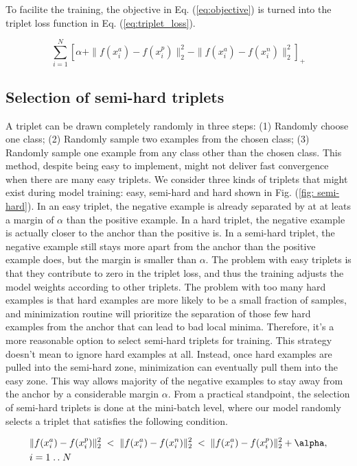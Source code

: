 To facilite the training, the objective in Eq. (\ref{eq:objective}) is turned into the
triplet loss function in Eq. (\ref{eq:triplet_loss}).

\begin{equation} \label{eq:triplet_loss}
    \sum_{i=1}^{N} \left[ \alpha + \|f(x_i^a) - f(x_i^p)\|_2^2 - \|f(x_i^a) -
    f(x_i^n)\|_2^2 \right]_+
\end{equation}


\subsection{Selection of semi-hard triplets}

A triplet can be drawn completely randomly in three steps: (1) Randomly choose
one class;  (2) Randomly sample two examples from the chosen class;  (3)
Randomly sample one example from any class other than the chosen class.  This
method, despite being easy to implement, might not deliver fast convergence when
there are many easy triplets.  We consider three kinds of triplets that might
exist during model training: easy, semi-hard and hard shown in Fig. (\ref{fig:
semi-hard}).  In an easy triplet, the negative example is already separated by
at at leats a margin of $\alpha$ than the positive example.  In a hard triplet,
the negative example is actually closer to the anchor than the positive is.  In
a semi-hard triplet, the negative example still stays more apart from the anchor
than the positive example does, but the margin is smaller than $\alpha$.  The
problem with easy triplets is that they contribute to zero in the triplet loss,
and thus the training adjusts the model weights according to other triplets. The
problem with too many hard examples is that hard examples are more likely to be
a small fraction of samples, and minimization routine will prioritize the
separation of those few hard examples from the anchor that can lead to bad local
minima.  Therefore, it's a more reasonable option to select semi-hard triplets
for training.  This strategy doesn't mean to ignore hard examples at all.
Instead, once hard examples are pulled into the semi-hard zone, minimization can
eventually pull them into the easy zone. This way allows majority of the
negative examples to stay away from the anchor by a considerable margin
$\alpha$.  From a practical standpoint, the selection of semi-hard triplets is
done at the mini-batch level, where our model randomly selects a triplet that
satisfies the following condition.  

\begin{equation}\label{eq: semi-hard condition}
    \begin{aligned}[b]
    &\|f(x_i^a) - f(x_i^p)\|_2^2 \;<\; \|f(x_i^a) - f(x_i^n)\|_2^2 \;<\;
    \|f(x_i^a) - f(x_i^p)\|_2^2 + \alpha, \\
    &i = 1 \isep N
    \end{aligned}
\end{equation}

